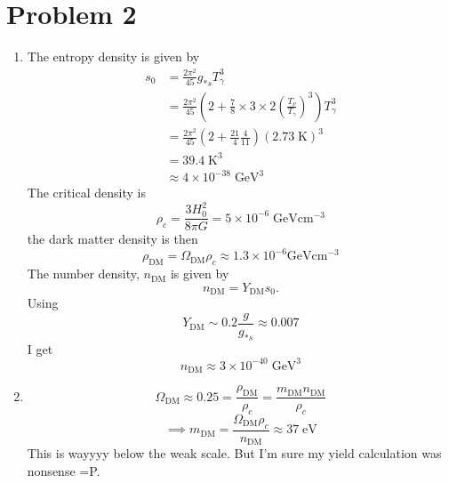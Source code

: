 \documentclass[12pt]{article}
\begin{document}
\section*{Problem 2}
\begin{enumerate}[label=\roman*)]
    \item The entropy density is given by
    \begin{align*}
        s_0 &= \frac{2\pi^2}{45}g_{*s}T_\gamma^3 \\
        &= \frac{2\pi^2}{45}\left(2 + \frac{7}{8}\times3\times2\left(\frac{T_\nu}{T_\gamma}\right)^3\right)T_\gamma^3 \\
        &= \frac{2\pi^2}{45}\left(2 + \frac{21}{4}\frac{4}{11}\right)(2.73\;\text{K})^3 \\
        &= 39.4\;\text{K}^3 \\
        &\approx 4\times10^{-38}\;\text{GeV}^3
    \end{align*}
    The critical density is
    \[ \rho_c = \frac{3H_0^2}{8\pi G} = 5\times10^{-6}\;\text{GeV}\text{cm}^{-3} \]
    the dark matter density is then
    \[ \rho_\text{DM} = \Omega_\text{DM}\rho_c \approx 1.3\times10^{-6}\text{GeV}\text{cm}^{-3} \]
    The number density, $n_\text{DM}$ is given by
    \[ n_\text{DM} = Y_\text{DM} s_0. \]
    Using 
    \[ Y_\text{DM} \sim 0.2 \frac{g}{g_{*s}} \approx 0.007 \]
    I get
    \[ n_\text{DM} \approx 3\times10^{-40}\;\text{GeV}^3 \]
    \item 
    \[ \Omega_\text{DM} \approx 0.25 = \frac{\rho_\text{DM}}{\rho_c} = \frac{m_\text{DM}n_\text{DM}}{\rho_c} \]
    \[ \implies m_\text{DM} = \frac{\Omega_\text{DM}\rho_c}{n_\text{DM}} \approx 37\;\text{eV} \]
    This is wayyyy below the weak scale. But I'm sure my yield calculation was nonsense =P.
\end{enumerate}
\end{document}
